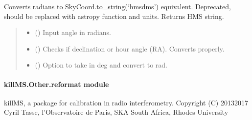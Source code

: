 \documentclass[letterpaper,10pt,english]{sphinxmanual}
\begin{document}
\begin{fulllineitems}
\label{\detokenize{api/killMS.Other:killMS.Other.rad2hmsdms.rad2hmsdms}}
\pysigstartsignatures
{}
\pysigstopsignatures
\sphinxAtStartPar
Converts radians to SkyCoord.to\_string(‘hmsdms’) equivalent.
Deprecated, should be replaced with astropy function and units.
Returns HMS string.
\begin{quote}\begin{description}
\begin{itemize}
\item {} 
\sphinxAtStartPar
{} () \textendash{} Input angle in radians.

\item {} 
\sphinxAtStartPar
{} () \textendash{} Checks if declination or hour angle (RA). Converts properly.

\item {} 
\sphinxAtStartPar
{} () \textendash{} Option to take in deg and convert to rad.

\end{itemize}

\sphinxAtStartPar
{}

\end{description}\end{quote}

\end{fulllineitems}



\paragraph{killMS.Other.reformat module}
\label{\detokenize{api/killMS.Other:module-killMS.Other.reformat}}\label{\detokenize{api/killMS.Other:killms-other-reformat-module}}
\sphinxAtStartPar
killMS, a package for calibration in radio interferometry.
Copyright (C) 2013\sphinxhyphen{}2017  Cyril Tasse, l’Observatoire de Paris,
SKA South Africa, Rhodes University
\end{document}
